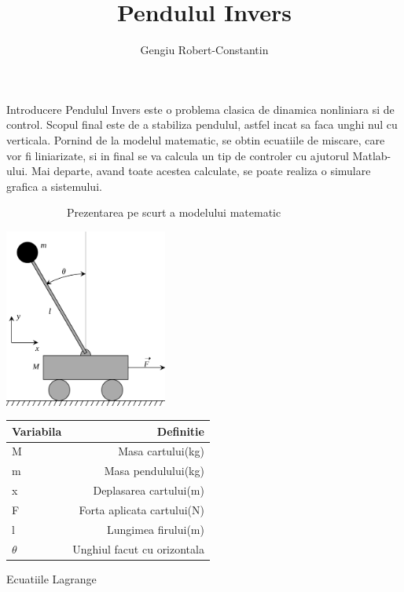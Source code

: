 \documentclass[12pt]{article}
\title{Pendulul Invers}
\author{Gengiu Robert-Constantin}
\begin{document}
\maketitle
\flushleft
Introducere \newline
Pendulul Invers este o problema clasica de dinamica nonliniara si de control. Scopul final este de a stabiliza pendulul, astfel incat sa faca unghi nul cu verticala. Pornind de la modelul matematic, se obtin ecuatiile de miscare, care vor fi liniarizate, si in final se va calcula un tip de controler cu ajutorul Matlab-ului. Mai departe, avand toate acestea calculate, se poate realiza o simulare grafica a sistemului.\newline 

\center
~~~~~~~~~~~Prezentarea pe scurt a modelului matematic\newline
\begin{center}
\includegraphics[width = 0.4\textwidth]{pen.png} \newline 
\end{center}
\flushleft

\medskip
\begin{center}
  \begin{tabular}{ | l | r | }
    \hline
    Variabila & Definitie \\  \hline
    M & Masa cartului(kg) \\ \hline
    m & Masa pendulului(kg) \\ \hline
     x & Deplasarea cartului(m) \\ \hline
    F & Forta aplicata cartului(N) \\ \hline
    l & Lungimea firului(m) \\ \hline 
   $\theta$ & Unghiul facut cu orizontala \\
    \hline
  \end{tabular}
\end{center}
\medskip

Ecuatiile Lagrange
\end{document}
